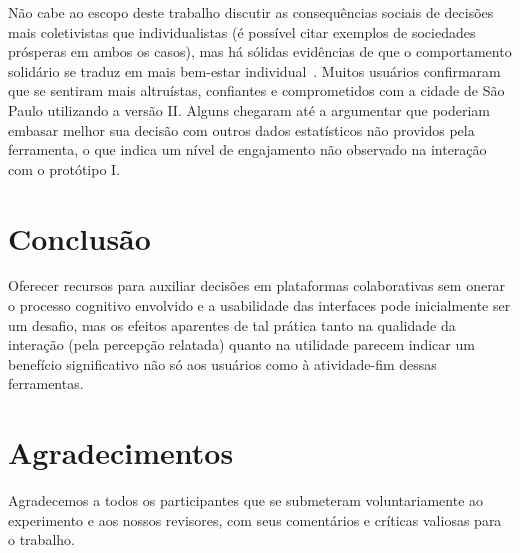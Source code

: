 \documentclass{sigchi}
\begin{document}
Não cabe ao escopo deste trabalho discutir as consequências sociais de decisões mais coletivistas que individualistas (é possível citar exemplos de sociedades prósperas em ambos os casos), mas há sólidas evidências de que o comportamento solidário se traduz em mais bem-estar individual~\cite{thoits:2001}. Muitos usuários confirmaram que se sentiram mais altruístas, confiantes e comprometidos com a cidade de São Paulo utilizando a versão II. Alguns chegaram até a argumentar que poderiam embasar melhor sua decisão com outros dados estatísticos não providos pela ferramenta, o que indica um nível de engajamento não observado na interação com o protótipo I.


%


\section{Conclusão}
Oferecer recursos para auxiliar decisões em plataformas colaborativas sem onerar o processo cognitivo envolvido e a usabilidade das interfaces pode inicialmente ser um desafio, mas os efeitos aparentes de tal prática tanto na qualidade da interação (pela percepção relatada) quanto na utilidade parecem indicar um benefício significativo não só aos usuários como à atividade-fim dessas ferramentas.


\section{Agradecimentos}

Agradecemos a todos os participantes que se submeteram voluntariamente ao experimento e aos nossos revisores, com seus comentários e críticas valiosas para o trabalho.


\balance{}


\balance{}



\end{document}
